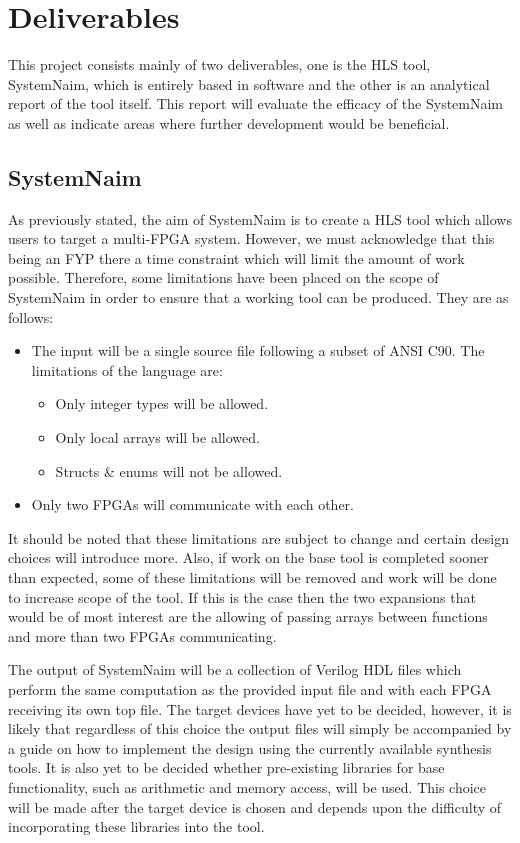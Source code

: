 \section{Deliverables}

This project consists mainly of two deliverables, one is the HLS tool, SystemNaim, which is entirely based in software and the other is an analytical report of the tool itself. This report will evaluate the efficacy of the SystemNaim as well as indicate areas where further development would be beneficial.

\subsection{SystemNaim}

As previously stated, the aim of SystemNaim is to create a HLS tool which allows users to target a multi-FPGA system. However, we must acknowledge that this being an FYP there a time constraint which will limit the amount of work possible. Therefore, some limitations have been placed on the scope of SystemNaim in order to ensure that a working tool can be produced. They are as follows:

\begin{itemize}
    \item The input will be a single source file following a subset of ANSI C90. The limitations of the language are:
    \begin{itemize}
        \item Only integer types will be allowed.
        \item Only local arrays will be allowed.
        \item Structs \& enums will not be allowed.
    \end{itemize}
    \item Only two FPGAs will communicate with each other.
\end{itemize}

It should be noted that these limitations are subject to change and certain design choices will introduce more. Also, if work on the base tool is completed sooner than expected, some of these limitations will be removed and work will be done to increase scope of the tool. If this is the case then the two expansions that would be of most interest are the allowing of passing arrays between functions and more than two FPGAs communicating.

The output of SystemNaim will be a collection of Verilog HDL files which perform the same computation as the provided input file and with each FPGA receiving its own top file. The target devices have yet to be decided, however, it is likely that regardless of this choice the output files will simply be accompanied by a guide on how to implement the design using the currently available synthesis tools. It is also yet to be decided whether pre-existing libraries for base functionality, such as arithmetic and memory access, will be used. This choice will be made after the target device is chosen and depends upon the difficulty of incorporating these libraries into the tool.


